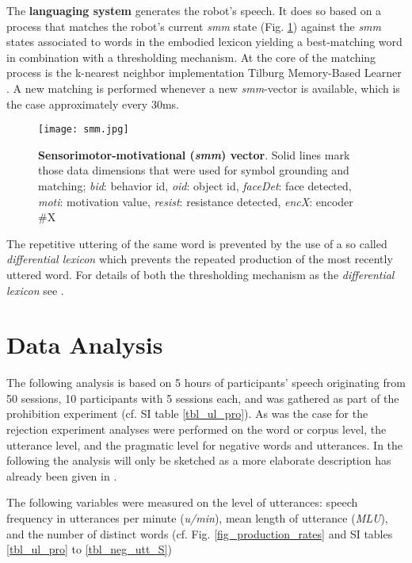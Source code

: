 The \textbf{languaging system} generates the robot's speech. It does so based on a process that matches the robot's current \emph{smm} state (Fig.
\ref{fig_smm_vector}) against the \emph{smm} states associated to words in the embodied lexicon yielding a best-matching word in combination with a thresholding
mechanism. At the core of the matching process is the k-nearest neighbor implementation Tilburg Memory-Based Learner \cite{TiMBL2005}.
A new matching is performed whenever a new \emph{smm}-vector is available, which is the case approximately every 30ms.
\begin{figure}
  \begin{center}
    \centerline{\texttt{[image: smm.jpg]}}
  \end{center}
  \caption{\textbf{Sensorimotor-motivational (\emph{smm}) vector}. Solid lines mark those data dimensions that were used for symbol grounding
    and matching; \emph{bid}: behavior id, \emph{oid}: object id, \emph{faceDet}: face detected, \emph{moti}: motivation value, \emph{resist}:
    resistance detected, \emph{encX}: encoder \#X}
  \label{fig_smm_vector}
\end{figure}
The repetitive uttering of the same word is prevented by the use of a so called \emph{differential lexicon} which prevents the repeated production
of the most recently uttered word. For details of both the thresholding mechanism as the \emph{differential lexicon} see \cite{Foerster2013,Foerster2017}.

\section{Data Analysis} The following analysis is based on 5 hours of participants' speech originating from 50 sessions, 10 participants with 5 sessions
each, and was gathered as part of the prohibition experiment (cf. SI table \ref{tbl_ul_pro}). As was the case for the rejection experiment analyses were
performed on the word or corpus level, the utterance level, and the pragmatic level for negative words and utterances.
In the following the analysis will only be sketched as a more elaborate description has already been given in \cite{Foerster2017}.

The following variables were measured on the level of utterances: speech frequency in utterances per minute (\emph{u/min}), mean length of
utterance (\emph{MLU}), and the number of distinct words (cf. Fig. \ref{fig_production_rates} and SI tables \ref{tbl_ul_pro} to \ref{tbl_neg_utt_S})

